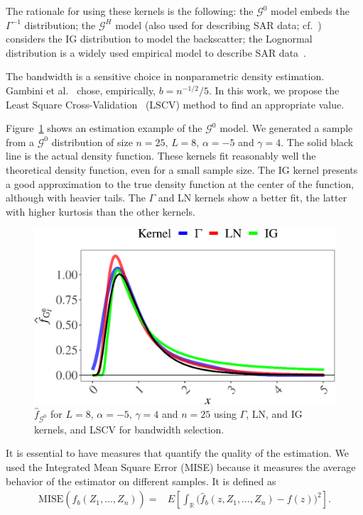 \documentclass[twocolumn]{svjour3}
\begin{document}
The rationale for using these kernels is the following:
the $\mathcal{G}^0$ model embeds the $\Gamma^{-1}$ distribution;
the $\mathcal{G}^H$ model (also used for describing SAR data; cf.~\cite{PolarimetricSegmentationBSplinesMSSP}) considers the IG distribution to model the backscatter;
the Lognormal distribution is a widely used empirical model to describe SAR data~\cite{Gao2010}. 

The bandwidth is a sensitive choice in nonparametric density estimation. 
Gambini et al.~\cite{gambini2015} chose, empirically, $b=n^{-1/2}/5$. 
In this work, we propose the Least Square Cross-Validation~\cite{Wu1997} (LSCV) method to find an appropriate value.

Figure~\ref{EstimacionLNyGAyIG} shows an estimation example of the $\mathcal{G}^0$ model. 
We generated a sample from a $\mathcal{G}^0$ distribution of size $n=25$, $L = 8$, $\alpha=-5$ and $\gamma=4$. 
The solid black line is the actual density function. 
These kernels fit reasonably well the theoretical density function, even for a small sample size. 
The IG kernel presents a good approximation to the true density function at the center of the function, although with heavier tails. 
The $\Gamma$ and LN kernels show a better fit, the latter with higher kurtosis than the other kernels.

\begin{figure}[hbt]
\centering
\includegraphics[width=\linewidth]{NucleosGALNyIG}
\caption{$\widehat{f}_{\mathcal{G}^0}$ for $L=8$, $\alpha=-5$, $\gamma=4$ and $n=25$ using $\Gamma$, LN, and IG kernels, and LSCV for bandwidth selection.}\label{EstimacionLNyGAyIG}
\end{figure}

It is essential to have measures that quantify the quality of the estimation. 
We used the Integrated Mean Square Error (MISE) because it measures the average behavior of the estimator on different samples. 
It is defined as
\begin{align}
\label{Mise}
\text{MISE}(\widehat{f}_b(Z_1,\ldots,Z_n))=&E\left[\int_\mathbb{R} \big(\widehat{f}_b(z,Z_1,\ldots,Z_n)-f(z)\big)^2 \right].
\end{align}
\end{document}
